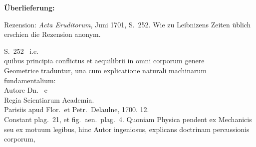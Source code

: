 %  
%			
%
%
%
%
%
\frenchspacing
%
\begin{ledgroupsized}[r]{120mm}
\footnotesize
\pstart
\noindent\textbf{Überlieferung:}
\pend
\end{ledgroupsized}
%
\begin{ledgroupsized}[r]{114mm}
\footnotesize
\pstart
\parindent -6mm
%
Rezension:
\cite{01023}\textit{Acta Eruditorum}, Juni 1701, S.~252.
Wie zu Leibnizens Zeiten üblich erschien die Rezension anonym.
\pend%
\end{ledgroupsized}
%
%
\frenchspacing
\vspace{8mm}
\pstart%
\normalsize%
\noindent%
\lbrack S.~252\rbrack\
\pend 
%
\pstart
{}\protect{}
%
\pend
%
\pstart\centering
i.e. 
\pend
%
\pstart
\centering
{}\\
quibus principia conflictus et aequilibrii in omni corporum genere\\
Geometrice traduntur, una cum explicatione naturali machinarum fundamentalium:\\
Autore Dn.\ \protect{} 
e\\
Regia Scientiarum Academia.\protect{}\\
Parisiis apud Flor.\ et Petr.\ Delaulne, 1700. 12.\\
Constant plag.~21, et fig.\ aen.\ plag.~4.  
\pend
\vspace{1em}
\count{}%
\count{}%
\count{}
%
\pstart \noindent Quoniam Physica pendent ex Mechanicis seu ex motuum legibus, 
%
hinc Autor ingeniosus, explicans doctrinam percussionis corporum, 
